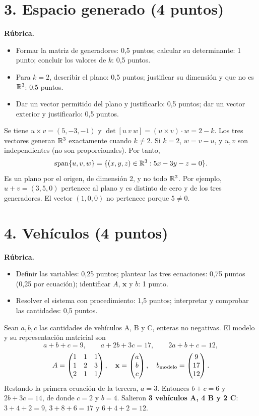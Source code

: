 \documentclass[10pt,a4]{examenEPN0}
\begin{document}
\section*{3. Espacio generado (4 puntos)}
\noindent\textbf{Rúbrica.}
\begin{itemize}[itemsep=2pt]
    \item Formar la matriz de generadores: 0,5 puntos; calcular su determinante: 1 punto; concluir los valores de $k$: 0,5 puntos.
    \item Para $k=2$, describir el plano: 0,5 puntos; justificar su dimensión y que no es $\mathbb{R}^3$: 0,5 puntos.
    \item Dar un vector permitido del plano y justificarlo: 0,5 puntos; dar un vector exterior y justificarlo: 0,5 puntos.
\end{itemize}
Se tiene $u\times v=(5,-3,-1)$ y
$\det[u\ v\ w]=(u\times v)\cdot w=2-k$.
Los tres vectores generan $\mathbb{R}^3$ exactamente cuando $k\ne2$.
Si $k=2$, $w=v-u$, y $u,v$ son independientes (no son proporcionales).
Por tanto,
\[
    \operatorname{span}\{u,v,w\}=\{(x,y,z)\in\mathbb{R}^3:5x-3y-z=0\}.
\]
Es un plano por el origen, de dimensión 2, y no todo $\mathbb{R}^3$.
Por ejemplo, $u+v=(3,5,0)$ pertenece al plano y es distinto de cero y de
los tres generadores. El vector $(1,0,0)$ no pertenece porque $5\ne0$.

\section*{4. Vehículos (4 puntos)}
\noindent\textbf{Rúbrica.}
\begin{itemize}[itemsep=2pt]
    \item Definir las variables: 0,25 puntos; plantear las tres ecuaciones: 0,75 puntos (0,25 por ecuación); identificar $A$, $\mathbf{x}$ y $b$: 1 punto.
    \item Resolver el sistema con procedimiento: 1,5 puntos; interpretar y comprobar las cantidades: 0,5 puntos.
\end{itemize}
Sean $a,b,c$ las cantidades de vehículos A, B y C, enteras no negativas.
El modelo y su representación matricial son
\[
    a+b+c=9,\qquad a+2b+3c=17,\qquad 2a+b+c=12,
\]
\[
    A=\begin{pmatrix}1&1&1\\1&2&3\\2&1&1\end{pmatrix},\quad
    \mathbf{x}=\begin{pmatrix}a\\b\\c\end{pmatrix},\quad
    b_{\rm modelo}=\begin{pmatrix}9\\17\\12\end{pmatrix}.
\]
Restando la primera ecuación de la tercera, $a=3$. Entonces $b+c=6$
y $2b+3c=14$, de donde $c=2$ y $b=4$.
Salieron \textbf{3 vehículos A, 4 B y 2 C}:
$3+4+2=9$, $3+8+6=17$ y $6+4+2=12$.
\end{document}
